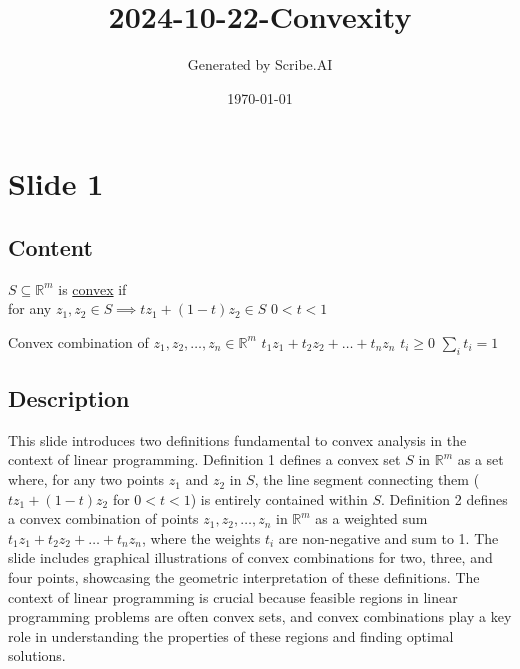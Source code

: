 \documentclass{article}%
\title{2024{-}10{-}22{-}Convexity}%
\author{Generated by Scribe.AI}%
\date{\today}%
\begin{document}
%
\normalsize%
\maketitle%
\section{Slide 1}%
\label{sec:Slide1}%
\subsection{Content}%

\underline{} \quad $S \subseteq \mathbb{R}^m$ is \underline{convex} if \\
for any $z_1, z_2 \in S \implies tz_1 + (1-t)z_2 \in S$
$0 < t < 1$

\underline{} Convex combination of $z_1, z_2, \dots, z_n \in \mathbb{R}^m$
$t_1 z_1 + t_2 z_2 + \dots + t_n z_n$
$t_i \ge 0$
$\sum_i t_i = 1$
%
\subsection{Description}%
This slide introduces two definitions fundamental to convex analysis in the context of linear programming.  Definition 1 defines a convex set $S$ in $\mathbb{R}^m$ as a set where, for any two points $z_1$ and $z_2$ in $S$, the line segment connecting them ($tz_1 + (1-t)z_2$ for $0 < t < 1$) is entirely contained within $S$.  Definition 2 defines a convex combination of points $z_1, z_2, \dots, z_n$ in $\mathbb{R}^m$ as a weighted sum $t_1z_1 + t_2z_2 + \dots + t_nz_n$, where the weights $t_i$ are non-negative and sum to 1.  The slide includes graphical illustrations of convex combinations for two, three, and four points, showcasing the geometric interpretation of these definitions.  The context of linear programming is crucial because feasible regions in linear programming problems are often convex sets, and convex combinations play a key role in understanding the properties of these regions and finding optimal solutions.%
\end{document}
